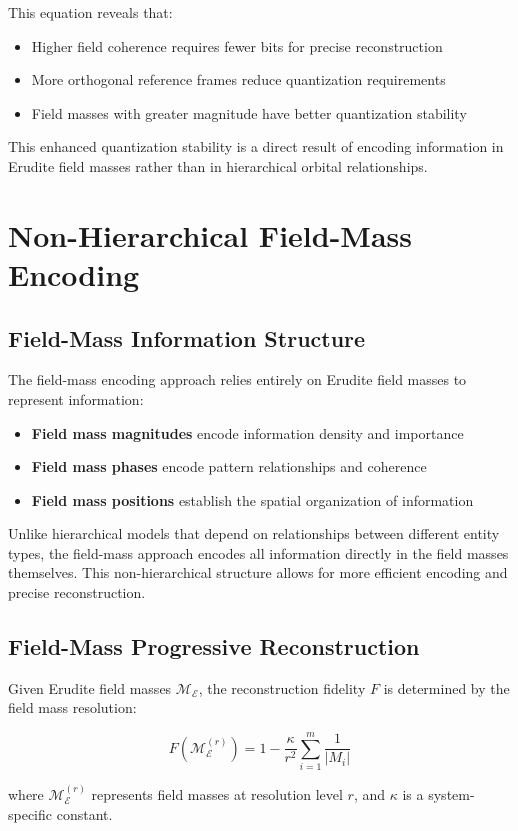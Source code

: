 This equation reveals that:
\begin{itemize}
    \item Higher field coherence requires fewer bits for precise reconstruction
    \item More orthogonal reference frames reduce quantization requirements
    \item Field masses with greater magnitude have better quantization stability
\end{itemize}

This enhanced quantization stability is a direct result of encoding information in Erudite field masses rather than in hierarchical orbital relationships.

\section{Non-Hierarchical Field-Mass Encoding}

\subsection{Field-Mass Information Structure}

The field-mass encoding approach relies entirely on Erudite field masses to represent information:

\begin{itemize}
    \item \textbf{Field mass magnitudes} encode information density and importance
    \item \textbf{Field mass phases} encode pattern relationships and coherence
    \item \textbf{Field mass positions} establish the spatial organization of information
\end{itemize}

Unlike hierarchical models that depend on relationships between different entity types, the field-mass approach encodes all information directly in the field masses themselves. This non-hierarchical structure allows for more efficient encoding and precise reconstruction.

\subsection{Field-Mass Progressive Reconstruction}

\begin{proposition}
Given Erudite field masses $\mathcal{M}_\mathcal{E}$, the reconstruction fidelity $F$ is determined by the field mass resolution:

\begin{equation}
F(\mathcal{M}_\mathcal{E}^{(r)}) = 1 - \frac{\kappa}{r^2} \sum_{i=1}^m \frac{1}{|M_i|}
\end{equation}

where $\mathcal{M}_\mathcal{E}^{(r)}$ represents field masses at resolution level $r$, and $\kappa$ is a system-specific constant.
\end{proposition}

